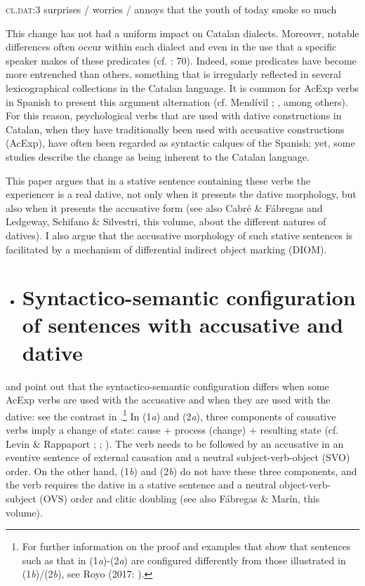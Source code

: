 \documentclass[output=paper,modfonts,nonflat]{langsci/langscibook}
\begin{document}
       \textsc{cl.dat:3} surprises / worries  /  annoys   that the youth     of today smoke so much

This change has not had a uniform impact on Catalan dialects. Moreover, notable differences often occur within each dialect and even in the use that a specific speaker makes of these predicates (cf. \citealt{CabréMateu1998}: 70). Indeed, some predicates have become more entrenched than others, something that is irregularly reflected in several lexicographical collections in the Catalan language. It is common for AcExp verbs in Spanish to present this argument alternation (cf. Mendívil \citealt{Giró2005}; \citealt{MarínMcNally2011}, among others). For this reason, psychological verbs that are used with dative constructions in Catalan, when they have traditionally been used with accusative constructions (AcExp), have often been regarded as syntactic calques of the Spanish; yet, some studies describe the change as being inherent to the Catalan language.

This paper argues that in a stative sentence containing these verbs the experiencer is a real dative, not only when it presents the dative morphology, but also when it presents the accusative form (see also Cabré \& Fábregas and Ledgeway, Schifano \& Silvestri, this volume, about the different natures of datives). I also argue that the accusative morphology of such stative sentences is facilitated by a mechanism of differential indirect object marking (DIOM).

\begin{itemize}
\item \section{Syntactico-semantic configuration of sentences with accusative and dative}
\end{itemize}

\citet{Ynglès1991} and \citet{CabréMateu1998} point out that the syntactico-semantic configuration differs when some AcExp verbs are used with the accusative and when they are used with the dative: see the contrast in .\footnote{For further information on the proof and examples that show that sentences such as that in (1\textit{a}){}-(2\textit{a}) are configured differently from those illustrated in (1\textit{b})/(2\textit{b}), see Royo (2017: ).} In (1\textit{a}) and (2\textit{a}), three components of causative verbs imply a change of state: cause + process (change) + resulting state (cf. Levin \& Rappaport \citealt{Hovav1995}; \citealt{CabréMateu1998}; \citealt{Rosselló2008}). The verb needs to be followed by an accusative in an eventive sentence of external causation and a neutral subject-verb-object (SVO) order. On the other hand, (1\textit{b}) and (2\textit{b}) do not have these three components, and the verb requires the dative in a stative sentence and a neutral object-verb-subject (OVS) order and clitic doubling (see also Fábregas \& Marín, this volume).
\end{document}
